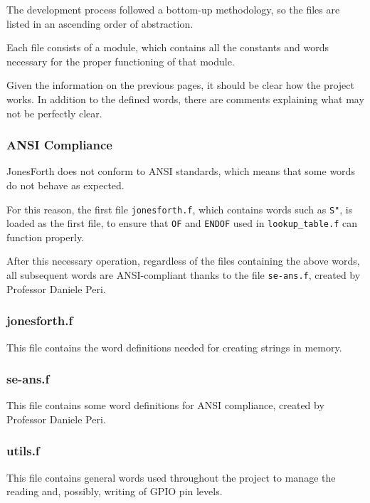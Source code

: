 \documentclass[a4paper, 12pt]{article}
\begin{document}
The development process followed a bottom-up methodology, so the files are listed in an ascending order of abstraction.

Each file consists of a module, which contains all the constants and words necessary for the proper functioning of that module.

Given the information on the previous pages, it should be clear how the project works. In addition to the defined words, there are comments explaining what may not be perfectly clear.

\subsubsection{ANSI Compliance}
JonesForth does not conform to ANSI\cite{ANSICompliance} standards, which means that some words do not behave as expected.

For this reason, the first file \texttt{jonesforth.f}, which contains words such as \texttt{S"}, is loaded as the first file, to ensure that \texttt{OF} and \texttt{ENDOF} used in \texttt{lookup\_table.f} can function properly.

After this necessary operation, regardless of the files containing the above words, all subsequent words are ANSI-compliant thanks to the file \texttt{se-ans.f}, created by Professor Daniele Peri.

\subsubsection{jonesforth.f}
This file contains the word definitions needed for creating strings in memory.

\subsubsection{se-ans.f}
This file contains some word definitions for ANSI compliance, created by Professor Daniele Peri.

\subsubsection{utils.f}
This file contains general words used throughout the project to manage the reading and, possibly, writing of GPIO pin levels.
\end{document}
